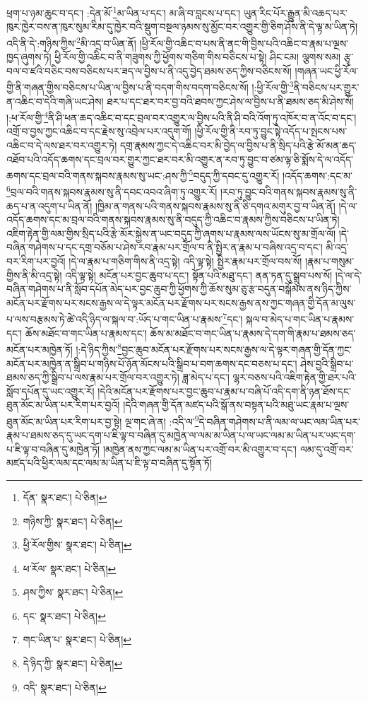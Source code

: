 ཕྲག་པ་ཉམ་ཆུང་བ་དང་། :དེན་མོ་\footnote{དོན་  སྣར་ཐང་།  པེ་ཅིན། }མ་ཡིན་པ་དང་། མ་ཞི་བ་བླངས་པ་དང་། ཡུན་རིང་པོར་རྒྱུན་མི་འཆད་པར་ཁུར་ཁྱེར་བས་ན་ཁུར་སུམ་རིམ་དུ་ཁྱེར་བའི་སྡུག་བསྔལ་ཉམས་སུ་མྱོང་བར་འགྱུར་གྱི་ཅིག་ཤོས་ནི་དེ་ལྟ་མ་ཡིན་ཏེ། འདི་ནི་དེ་:གཉིས་ཀྱིས་\footnote{གཉིས་ཀྱི་  སྣར་ཐང་།  པེ་ཅིན། }མི་འདྲ་བ་ཡིན་ནོ། །ཕྱི་རོལ་གྱི་འཆིང་བ་པས་ནི་ནང་གི་བྱིས་པའི་འཆིང་བ་རྣམ་པ་ལྔས་ཁྱད་ཞུགས་ཏེ། ཕྱི་རོལ་གྱི་འཆིང་བ་ནི་གཟུགས་ཀྱི་ཕྱོགས་གཅིག་གིས་བཅིངས་པ་སྟེ། ཤིང་ངམ། ལྕགས་སམ། རྩྭ་བལ་བ་ཛའི་བཅིང་བས་བཅིངས་པར་ཟད་ལ་བྱིས་པ་ནི་འདུ་བྱེད་ཐམས་ཅད་ཀྱིས་བཅིངས་སོ། །གཞན་ཡང་ཕྱི་རོལ་གྱི་ནི་གཞན་གྱིས་བཅིངས་པ་ཡིན་ལ་བྱིས་པ་ནི་བདག་གིས་བདག་བཅིངས་སོ། །:ཕྱི་རོལ་གྱི་\footnote{ཕྱི་རོལ་གྱིས་  སྣར་ཐང་།  པེ་ཅིན། }ནི་བཅིངས་པར་གྱུར་ན་འཆིང་བ་དེའི་གཞི་ཡང་ཤེས། ཐར་པ་དང་ཐར་བར་བྱ་བའི་ཐབས་ཀྱང་ཤེས་ལ་བྱིས་པ་ནི་ཐམས་ཅད་མི་ཤེས་སོ། །:ཕ་རོལ་གྱི་\footnote{ཕ་རོལ་  སྣར་ཐང་།  པེ་ཅིན། }ནི་ཤི་ཕན་ཆད་འཆིང་བ་དང་བྲལ་བར་འགྱུར་ལ་བྱིས་པའི་ནི་ཤི་བའི་འོག་ཏུ་འཁོར་བ་ན་འོང་བ་དང་། འགྲོ་བ་བྱས་ཀྱང་འཆིང་བ་དང་རྗེས་སུ་འབྲེལ་པར་འདུག་གོ། །ཕྱི་རོལ་གྱི་ནི་རབ་ཏུ་བྱུང་སྟེ་འདོད་པ་སྤངས་པས་འཆིང་བ་དེ་ལས་ཐར་བར་འགྱུར་ཏེ། དགྲ་རྣམས་ཀྱང་དེ་འཆིང་བར་མི་བྱེད་ལ་བྱིས་པ་ནི་སྲིད་པའི་རྩེ་མོ་མན་ཆད་འཐོབ་པའི་འདོད་ཆགས་དང་བྲལ་བར་གྱུར་ཀྱང་ཐར་བར་མི་འགྱུར་ན་རབ་ཏུ་བྱུང་བ་ཙམ་ལྟ་ཅི་སྨོས་དེ་ལ་འདོད་ཆགས་དང་བྲལ་བའི་གནས་སྐབས་རྣམས་སུ་ཡང་:ཤས་ཀྱི་\footnote{ཤས་ཀྱིས་  སྣར་ཐང་།  པེ་ཅིན། }བདུད་ཀྱི་དབང་དུ་འགྱུར་རོ། །འདོད་ཆགས་:དང་མ་\footnote{དང་  སྣར་ཐང་།  པེ་ཅིན། }བྲལ་བའི་གནས་སྐབས་རྣམས་སུ་ནི་དབང་འབའ་ཞིག་ཏུ་འགྱུར་རོ། །རབ་ཏུ་བྱུང་བའི་གནས་སྐབས་རྣམས་སུ་ནི་ཆད་པ་ན་འདུག་པ་ཡིན་ནོ། །ཁྱིམ་ན་གནས་པའི་གནས་སྐབས་རྣམས་སུ་ནི་ཅི་དགའ་མགུར་བྱ་བ་ཡིན་ནོ། །དེ་ལ་འདོད་ཆགས་དང་མ་བྲལ་བའི་གནས་སྐབས་རྣམས་སུ་ནི་བདུད་ཀྱི་འཆིང་བ་རྣམས་ཀྱིས་བཅིངས་པ་ཡིན་ཏེ། འཇིག་རྟེན་གྱི་ལམ་གྱིས་སྲིད་པའི་རྩེ་མོར་སྐྱེས་ན་ཡང་བདུད་ཀྱི་ཞགས་པ་རྣམས་ལས་ཡོངས་སུ་མ་གྲོལ་ལོ། །དེ་བཞིན་གཤེགས་པ་དང་དགྲ་བཅོམ་པ་ཤེས་རབ་རྣམ་པར་གྲོལ་བ་ནི་སྤྱིར་ན་རྣམ་པ་བཞིས་འདྲ་བ་དང་། མི་འདྲ་བར་རིག་པར་བྱའོ། །དེ་ལ་རྣམ་པ་གཅིག་གིས་ནི་འདྲ་སྟེ། འདི་ལྟ་སྟེ། སྤྱིར་རྣམ་པར་གྲོལ་བས་སོ། །རྣམ་པ་གསུམ་གྱིས་ནི་མི་འདྲ་སྟེ། འདི་ལྟ་སྟེ། མངོན་པར་བྱང་ཆུབ་པ་དང་། སྟོན་པའི་མཐུ་དང་། ནན་ཏན་དུ་སྒྲུབ་པས་སོ། །དེ་ལ་དེ་བཞིན་གཤེགས་པ་ནི་སློབ་དཔོན་མེད་པར་བྱང་ཆུབ་ཀྱི་ཕྱོགས་ཀྱི་ཆོས་སུམ་ཅུ་རྩ་བདུན་བསྒོམས་ནས་ཉིད་ཀྱིས་མངོན་པར་རྫོགས་པར་སངས་རྒྱས་ལ་དེ་ལྟར་མངོན་པར་རྫོགས་པར་སངས་རྒྱས་ནས་ཀྱང་གཞན་གྱི་དོན་མ་ལུས་པ་ལས་བརྩམས་ཏེ་ཚེ་འདི་ཉིད་ལ་སྐལ་བ་:ཡོད་པ་གང་ཡིན་པ་རྣམས་\footnote{གང་ཡིན་པ་  སྣར་ཐང་།  པེ་ཅིན། }དང་། སྐལ་བ་མེད་པ་གང་ཡིན་པ་རྣམས་དང་། ཆོས་མཐོང་བ་གང་ཡིན་པ་རྣམས་དང་། ཆོས་མ་མཐོང་བ་གང་ཡིན་པ་རྣམས་དེ་དག་གི་རྣམ་པ་ཐམས་ཅད་མངོན་པར་མཁྱེན་ཏོ། །:དེ་ཉིད་ཀྱིས་\footnote{དེ་ཉིད་ཀྱི་  སྣར་ཐང་།  པེ་ཅིན། }བྱང་ཆུབ་མངོན་པར་རྫོགས་པར་སངས་རྒྱས་ལ་དེ་ལྟར་གཞན་གྱི་དོན་ཀྱང་མངོན་པར་མཁྱེན་ན་སྒྲིབ་པ་གཉིས་པོ་ཉོན་མོངས་པའི་སྒྲིབ་པ་བག་ཆགས་དང་བཅས་པ་དང་། ཤེས་བྱའི་སྒྲིབ་པ་ཐམས་ཅད་ཀྱི་སྒྲིབ་པ་ལས་རྣམ་པར་གྲོལ་བར་འགྱུར་ཏེ། ཟླ་མེད་པ་དང་། ལྷར་བཅས་པའི་འཇིག་རྟེན་གྱི་ཐར་པའི་སློབ་དཔོན་དུ་ཡང་འགྱུར་རོ། །དེའི་མངོན་པར་རྫོགས་པར་བྱང་ཆུབ་པ་རྣམ་པ་བཞི་པོ་འདི་དག་ནི་ཉན་ཐོས་དང་ཐུན་མོང་མ་ཡིན་པར་རིག་པར་བྱའོ། །དེའི་གཞན་གྱི་དོན་མཛད་པའི་སྒོ་ནས་བསྟན་པའི་མཐུ་ཡང་རྣམ་པ་ལྔས་ཐུན་མོང་མ་ཡིན་པར་རིག་པར་བྱ་སྟེ། ལྔ་གང་ཞེ་ན། :འདི་ལ་\footnote{འདི་  སྣར་ཐང་།  པེ་ཅིན། }དེ་བཞིན་གཤེགས་པ་ནི་ལམ་ལ་ཡང་ལམ་ཡིན་པར་རྣམ་པ་ཐམས་ཅད་དུ་ཡང་དག་པ་ཇི་ལྟ་བ་བཞིན་དུ་མཁྱེན་ལ་ལམ་མ་ཡིན་པ་ལ་ཡང་ལམ་མ་ཡིན་པར་ཡང་དག་པ་ཇི་ལྟ་བ་བཞིན་དུ་མཁྱེན་ཏོ། །མཁྱེན་ནས་ཀྱང་ལམ་མ་ཡིན་པར་འགྲོ་བར་མི་འགྱུར་བ་དང་། ལམ་དུ་འགྲོ་བར་མཛད་པའི་ཕྱིར་ལམ་དང་ལམ་མ་ཡིན་པ་ཇི་ལྟ་བ་བཞིན་དུ་སྟོན་ཏོ། 